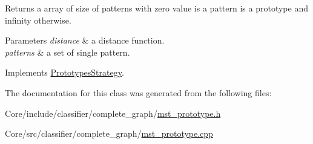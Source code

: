 Returns a array of size of patterns with zero value is a pattern is a prototype and infinity otherwise. 


\begin{DoxyParams}{Parameters}
{\em distance} & a distance function. \\
\hline
{\em patterns} & a set of single pattern. \\
\hline
\end{DoxyParams}


Implements \hyperlink{classPrototypesStrategy_a0422be14bb6be39a2d06112daf7043c1}{Prototypes\+Strategy}.



The documentation for this class was generated from the following files\+:\begin{DoxyCompactItemize}
\item 
Core/include/classifier/complete\+\_\+graph/\hyperlink{mst__prototype_8h}{mst\+\_\+prototype.\+h}\item 
Core/src/classifier/complete\+\_\+graph/\hyperlink{mst__prototype_8cpp}{mst\+\_\+prototype.\+cpp}\end{DoxyCompactItemize}
